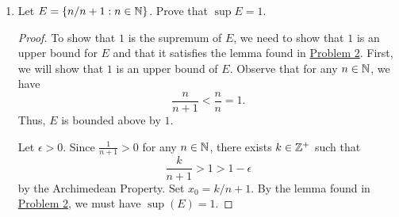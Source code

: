 \documentclass[11pt,a4paper]{article}
\begin{document}
\begin{enumerate}
\item Let \( E  = \{ n / n + 1 : n \in \mathbb{N}  \}  \). Prove that \( \sup E  = 1  \). 
    \begin{proof}
    To show that \( 1  \) is the supremum of \( E  \), we need to show that \( 1  \) is an upper bound for \( E  \) and that it satisfies the lemma found in {\hyperref[Problem 2]{Problem 2}}. First, we will show that \( 1  \) is an upper bound of \( E  \). Observe that for any \( n \in \mathbb{N}  \), we have  
    \[  \frac{ n  }{  n + 1  }  < \frac{  n }{ n }  = 1.  \]
    Thus, \( E  \) is bounded above by \( 1 \). 

    Let \( \epsilon > 0  \). Since \( \frac{ 1 }{ n+1 }  > 0   \) for any \( n \in \mathbb{N} \), there exists \( k \in \mathbb{Z}^{+} \) such that  
    \[  \frac{ k  }{ n  + 1  }  > 1 > 1 - \epsilon \]
    by the Archimedean Property. Set \( {x}_{0} = k / n +1  \). By the lemma found in {\hyperref[Problem 2]{Problem 2}}, we must have \( \sup(E) = 1  \).  
    

     \end{proof}


\end{enumerate}
\end{document}
